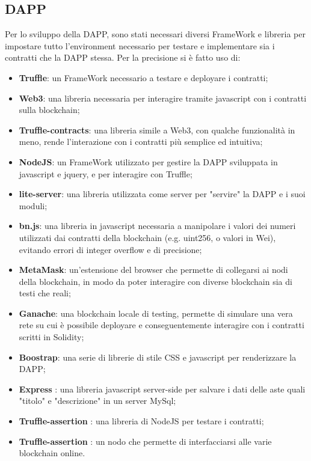 \subsection{DAPP}
Per lo sviluppo della DAPP, sono stati necessari diversi FrameWork e libreria per impostare tutto l'environment necessario per testare e implementare sia i contratti che la DAPP stessa. Per la precisione si è fatto uso di:\newline
\begin{itemize}
 	\item \textbf{Truffle}: un FrameWork necessario a testare e deployare i contratti;
 	\item \textbf{Web3}: una libreria necessaria per interagire tramite javascript con i contratti sulla blockchain;
 	\item \textbf{Truffle-contracts}: una libreria simile a Web3, con qualche funzionalità in meno, rende l'interazione con i contratti più semplice ed intuitiva;
 	\item \textbf{NodeJS}: un FrameWork utilizzato per gestire la DAPP sviluppata in javascript e jquery, e per interagire con Truffle;
 	\item \textbf{lite-server}: una libreria utilizzata come server per "servire" la DAPP e i suoi moduli;
 	\item \textbf{bn.js}: una libreria in javascript necessaria a manipolare i valori dei numeri utilizzati dai contratti della blockchain (e.g. uint256, o valori in Wei), evitando errori di integer overflow e di precisione;
 	\item \textbf{MetaMask}: un'estensione del browser che permette di collegarsi ai nodi della blockchain, in modo da poter interagire con diverse blockchain sia di testi che reali;
 	\item \textbf{Ganache}: una blockchain locale di testing, permette di simulare una vera rete su cui è possibile deployare e conseguentemente interagire con i contratti scritti in Solidity;
 	\item \textbf{Boostrap}: una serie di librerie di stile CSS e javascript per renderizzare la DAPP;
 	\item \textbf{Express} : una libreria javascript server-side per salvare i dati delle aste quali "titolo" e "descrizione" in un server MySql;
 	\item \textbf{Truffle-assertion} : una libreria di NodeJS per testare i contratti;
 	\item \textbf{Truffle-assertion} : un nodo che permette di interfacciarsi alle varie blockchain online.
\end{itemize}
